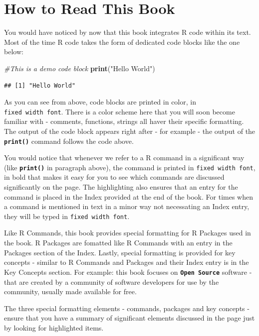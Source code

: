 \documentclass[]{krantz}
\makeatletter
\newenvironment{Shaded}{\begin{snugshade}}{\end{snugshade}}
\newcommand{\KeywordTok}[1]{\textcolor[rgb]{0.27,0.27,0.27}{\textbf{#1}}}
\newcommand{\StringTok}[1]{\textcolor[rgb]{0.5,0.5,0.5}{#1}}
\newcommand{\CommentTok}[1]{\textcolor[rgb]{0.56,0.35,0.01}{\textit{#1}}}
\newcommand{\NormalTok}[1]{#1}
\newenvironment{kframe}{%
\medskip{}
\setlength{\fboxsep}{.8em}
 \def\at@end@of@kframe{}%
 \ifinner\ifhmode%
  \def\at@end@of@kframe{\end{minipage}}%
  \begin{minipage}{\columnwidth}%
 \fi\fi%
 \def\FrameCommand##1{\hskip\@totalleftmargin \hskip-\fboxsep
 \colorbox{shadecolor}{##1}\hskip-\fboxsep
     \hskip-\linewidth \hskip-\@totalleftmargin \hskip\columnwidth}%
 \MakeFramed {\advance\hsize-\width
   \@totalleftmargin\z@ \linewidth\hsize
   \@setminipage}}%
 {\par\unskip\endMakeFramed%
 \at@end@of@kframe}
\renewenvironment{Shaded}{\begin{kframe}}{\end{kframe}}
\theoremstyle{definition}
\theoremstyle{definition}
\theoremstyle{definition}
\theoremstyle{remark}
\makeatother
\begin{document}
\section*{How to Read This Book}\label{how-to-read-this-book}


You would have noticed by now that this book integrates R code within
its text. Most of the time R code takes the form of dedicated code
blocks like the one below:

\begin{Shaded}
\begin{Highlighting}[]
\CommentTok{#This is a demo code block}
\KeywordTok{print}\NormalTok{(}\StringTok{"Hello World"}\NormalTok{)}
\end{Highlighting}
\end{Shaded}

\begin{verbatim}
## [1] "Hello World"
\end{verbatim}

As you can see from above, code blocks are printed in color, in
\texttt{fixed\ width\ font}. There is a color scheme here that you will
soon become familiar with - comments, functions, strings all haver their
specific formatting. The output of the code block appears right after -
for example - the output of the \textbf{\texttt{print()}} command
follows the code above.

You would notice that whenever we refer to a R command in a significant
way (like \textbf{\texttt{print()}} in paragraph above), the command is
printed in \texttt{fixed\ width\ font}, in bold that makes it easy for
you to see which commands are discussed significantly on the page. The
highlighting also ensures that an entry for the command is placed in the
Index provided at the end of the book. For times when a command is
mentioned in text in a minor way not necessating an Index entry, they
will be typed in \texttt{fixed\ width\ font}.

Like R Commands, this book provides special formatting for R Packages
used in the book. R Packages are fomatted like R Commands with an entry
in the Packages section of the Index. Lastly, special formatting is
provided for key concepts - similar to R Commands and Packages and their
Index entry is in the Key Concepts section. For example: this book
focuses on \textbf{\texttt{Open\ Source}} software - that are created by
a community of software developers for use by the community, usually
made available for free.

The three special formatting elements - commands, packages and key
concepts - ensure that you have a summary of significant elements
discussed in the page just by looking for highlighted items.
\end{document}

